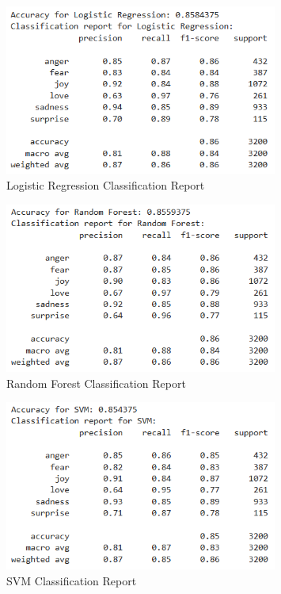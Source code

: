 \begin{figure}[h!]
\centering
\includegraphics[width=0.8\textwidth]{logistic_regression_result.png}
\caption{Logistic Regression Classification Report}
\label{fig:logistic_regression}
\end{figure}

\begin{figure}[h!]
\centering
\includegraphics[width=0.8\textwidth]{random_forest_result.png}
\caption{Random Forest Classification Report}
\label{fig:random_forest}
\end{figure}

\begin{figure}[h!]
\centering
\includegraphics[width=0.8\textwidth]{svm_result.png}
\caption{SVM Classification Report}
\label{fig:svm}
\end{figure}

